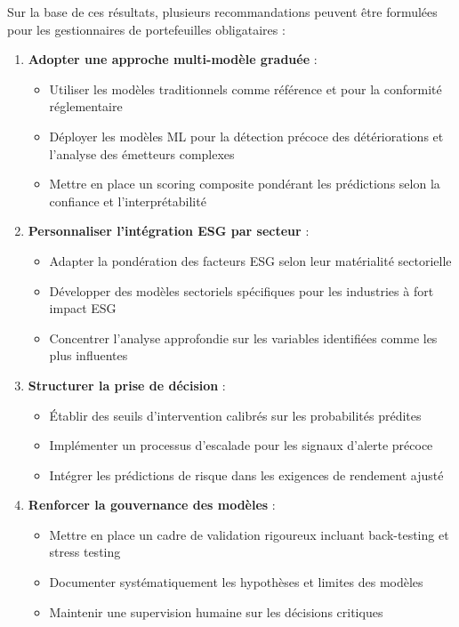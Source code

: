 Sur la base de ces résultats, plusieurs recommandations peuvent être formulées pour les gestionnaires de portefeuilles obligataires :

\begin{enumerate}
  \item \textbf{Adopter une approche multi-modèle graduée} :
  \begin{itemize}
    \item Utiliser les modèles traditionnels comme référence et pour la conformité réglementaire
    \item Déployer les modèles ML pour la détection précoce des détériorations et l'analyse des émetteurs complexes
    \item Mettre en place un scoring composite pondérant les prédictions selon la confiance et l'interprétabilité
  \end{itemize}

  \item \textbf{Personnaliser l'intégration ESG par secteur} :
  \begin{itemize}
    \item Adapter la pondération des facteurs ESG selon leur matérialité sectorielle
    \item Développer des modèles sectoriels spécifiques pour les industries à fort impact ESG
    \item Concentrer l'analyse approfondie sur les variables identifiées comme les plus influentes
  \end{itemize}

  \item \textbf{Structurer la prise de décision} :
  \begin{itemize}
    \item Établir des seuils d'intervention calibrés sur les probabilités prédites
    \item Implémenter un processus d'escalade pour les signaux d'alerte précoce
    \item Intégrer les prédictions de risque dans les exigences de rendement ajusté
  \end{itemize}

  \item \textbf{Renforcer la gouvernance des modèles} :
  \begin{itemize}
    \item Mettre en place un cadre de validation rigoureux incluant back-testing et stress testing
    \item Documenter systématiquement les hypothèses et limites des modèles
    \item Maintenir une supervision humaine sur les décisions critiques
  \end{itemize}


\end{enumerate}
